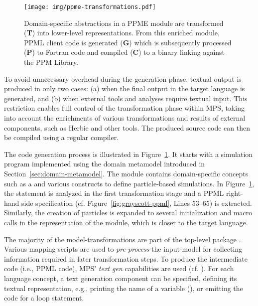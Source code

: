 
\begin{figure}[tp]
  \centering
  \texttt{[image: img/ppme-transformations.pdf]}
  \caption{%
    Domain-specific abstractions in a PPME module are transformed (\textbf{T}) into
    lower-level representations. From this enriched module, PPML client code is
    generated (\textbf{G}) which is subsequently processed (\textbf{P}) to Fortran
    code and compiled (\textbf{C}) to a binary linking against the PPM Library.%
  }
  \label{fig:ppme-transformation} %
\end{figure}
%
To avoid unnecessary overhead during the generation phase, textual output is produced
in only two cases: (a) when the final output in the target language is generated, and
(b) when external tools and analyses require textual input. This restriction enables
full control of the transformation phase within MPS, taking into account the
enrichments of various transformations and results of external components, such as
Herbie and other tools. The produced source code can then be compiled using a regular
compiler. 

The code generation process is illustrated in Figure~\ref{fig:ppme-transformation}. It starts
with a simulation program implemented using the domain metamodel introduced in
Section~\ref{sec:domain-metamodel}. The module contains domain-specific concepts such
as a  and various constructs to define particle-based
simulations. In Figure~\ref{fig:ppme-transformation}, the  statement
is analyzed in the first transformation stage and a PPML right-hand side specification
(cf. Figure~\ref{fig:grayscott-ppml}, Lines $53$--$65$) is extracted. Similarly, the
creation of particles is expanded to several initialization and macro calls in the
representation of the module, which is closer to the target language.

The majority of the model-transformations are part of the top-level package
. Various mapping scripts are used to \emph{pre-process} the
input-model for collecting information required in later transformation steps.
%
To produce the intermediate code (i.e., PPML code), MPS' \emph{text
gen} capabilities are used (cf. \cite{MPS32TextGen}). For each language concept, a
text generation component can be specified, defining its textual representation,
e.g., printing the name of a variable (), or emitting the
code for a loop statement.


